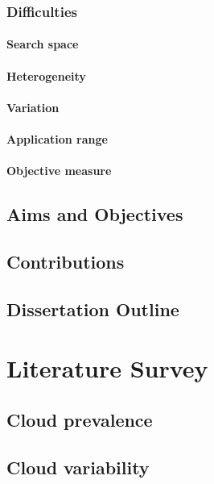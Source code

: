\documentclass{report}
\begin{document}
\subsection{Difficulties}
\subsubsection{Search space}
\subsubsection{Heterogeneity}
\subsubsection{Variation}
\subsubsection{Application range}
\subsubsection{Objective measure}
\section{Aims and Objectives}
\section{Contributions}
\section{Dissertation Outline}
\chapter{Literature Survey}
\section{Cloud prevalence}
\section{Cloud variability}
\end{document}
